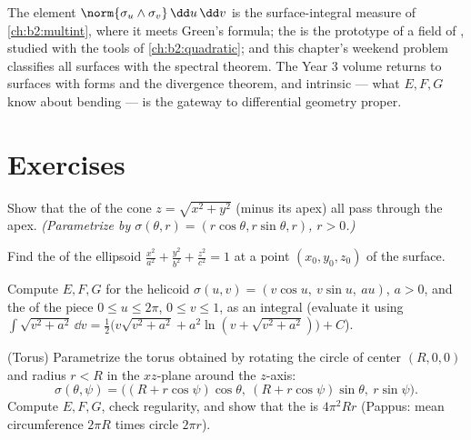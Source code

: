 \begin{remark}
The  element $\norm{\sigma_u\wedge\sigma_v}\,\dd u\,\dd v$
is the surface-integral measure of \cref{ch:b2:multint}, where
it meets Green's formula; the  is the
prototype of a field of , studied 
with the tools of \cref{ch:b2:quadratic}; and this chapter's
weekend problem classifies all  surfaces with the
spectral theorem. The Year 3 volume returns to surfaces with
 forms and the divergence theorem, and intrinsic
 --- what $E, F, G$ know about bending --- is the
gateway to differential geometry proper.
\end{remark}

\section{Exercises}

\begin{exercise}[$\star$]\label{exo:b2:surfaces:1}
Show that the  of the cone $z = \sqrt{x^2 + y^2}$
(minus its apex) all pass through the apex. \emph{(Parametrize by
$\sigma(\theta, r) = (r\cos\theta, r\sin\theta, r)$, $r > 0$.)}
\end{exercise}

\begin{exercise}[$\star$]\label{exo:b2:surfaces:2}
Find the  of the ellipsoid $\frac{x^2}{a^2} +
\frac{y^2}{b^2} + \frac{z^2}{c^2} = 1$ at a point $(x_0, y_0,
z_0)$ of the surface.
\end{exercise}

\begin{exercise}[$\star$]\label{exo:b2:surfaces:3}
Compute $E, F, G$ for the helicoid $\sigma(u, v) = (v\cos u,\
v\sin u,\ au)$, $a > 0$, and the  of the piece $0 \leq u \leq
2\pi$, $0 \leq v \leq 1$, as an integral (evaluate it using
$\int\sqrt{v^2 + a^2}\,\dd v = \frac12\bigl(v\sqrt{v^2+a^2} +
a^2\ln(v + \sqrt{v^2 + a^2})\bigr) + C$).
\end{exercise}

\begin{exercise}[$\star\star$]\label{exo:b2:surfaces:4}
(Torus) Parametrize the torus obtained by rotating the circle of
center $(R, 0, 0)$ and radius $r < R$ in the $xz$-plane around the
$z$-axis:
\[
\sigma(\theta, \psi) = \bigl((R + r\cos\psi)\cos\theta,\
(R + r\cos\psi)\sin\theta,\ r\sin\psi\bigr).
\]
Compute $E, F, G$, check regularity, and show that the  is
$4\pi^2 R r$ (Pappus: mean circumference $2\pi R$ times circle
\omterm{def:b2:curves:length}{length} $2\pi r$).
\end{exercise}


